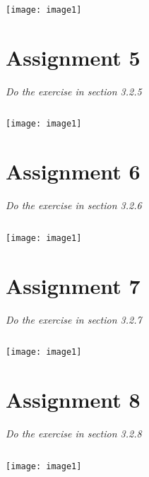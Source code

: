 \documentclass[]{article}
\begin{document}
\begin{verbatim}

\end{verbatim}
\texttt{[image: image1]} %


\section*{Assignment 5}
\emph{ Do the exercise in section 3.2.5 }

\begin{verbatim}

\end{verbatim}
\texttt{[image: image1]} %


\section*{Assignment 6}
\emph{ Do the exercise in section 3.2.6 }

\begin{verbatim}

\end{verbatim}
\texttt{[image: image1]} %


\section*{Assignment 7}
\emph{ Do the exercise in section 3.2.7 }

\begin{verbatim}

\end{verbatim}
\texttt{[image: image1]} %


\section*{Assignment 8}
\emph{ Do the exercise in section 3.2.8 }

\begin{verbatim}

\end{verbatim}
\texttt{[image: image1]} %
\end{document}
